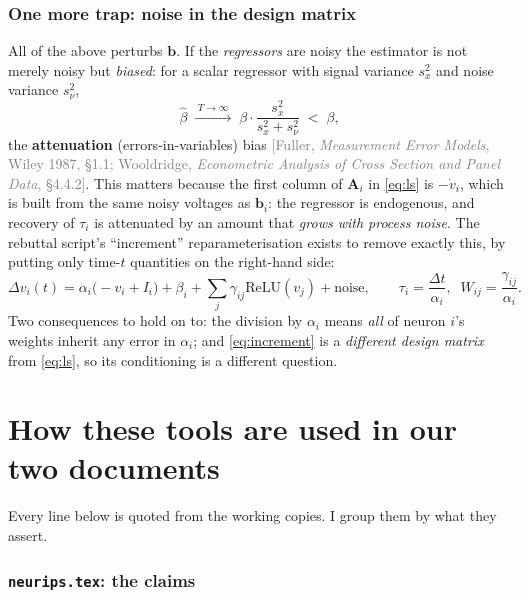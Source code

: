 \documentclass[11pt]{article}
\newcommand{\Mat}[1]{\mathbf{#1}}
\newcommand{\A}{\Mat{A}}
\newcommand{\src}[1]{{\footnotesize\textcolor{gray}{[#1]}}}
\begin{document}
\section{One more trap: noise in the design matrix}
\label{sec:eiv}
All of the above perturbs $\Mat b$. If the \emph{regressors} are noisy the
estimator is not merely noisy but \emph{biased}: for a scalar regressor with
signal variance $s_x^2$ and noise variance $s_\nu^2$,
\begin{equation}
\hat\beta \;\xrightarrow{\;T\to\infty\;}\; \beta\cdot\frac{s_x^2}{s_x^2+s_\nu^2}
\;<\; \beta ,
\label{eq:attenuation}
\end{equation}
the \textbf{attenuation} (errors-in-variables) bias \src{Fuller,
\emph{Measurement Error Models}, Wiley 1987, §1.1; Wooldridge, \emph{Econometric
Analysis of Cross Section and Panel Data}, §4.4.2}. This matters because the
first column of $\A_i$ in \eqref{eq:ls} is $-\dot v_i$, which is built from the
same noisy voltages as $\Mat b_i$: the regressor is endogenous, and recovery of
$\tau_i$ is attenuated by an amount that \emph{grows with process noise}. The
rebuttal script's ``increment'' reparameterisation exists to remove exactly
this, by putting only time-$t$ quantities on the right-hand side:
\begin{equation}
\Delta v_i(t) = \alpha_i\big(-v_i + I_i\big) + \beta_i
  + \textstyle\sum_j \gamma_{ij}\mathrm{ReLU}(v_j) + \text{noise},
\qquad
\tau_i = \frac{\Delta t}{\alpha_i},\;\;
W_{ij} = \frac{\gamma_{ij}}{\alpha_i}.
\label{eq:increment}
\end{equation}
Two consequences to hold on to: the division by $\alpha_i$ means \emph{all} of
neuron $i$'s weights inherit any error in $\alpha_i$; and \eqref{eq:increment}
is a \emph{different design matrix} from \eqref{eq:ls}, so its conditioning is a
different question.

\part{How these tools are used in our two documents}
\label{sec:usage}

Every line below is quoted from the working copies. I group them by what they
assert.

\section{\texttt{neurips.tex}: the claims}
\end{document}
